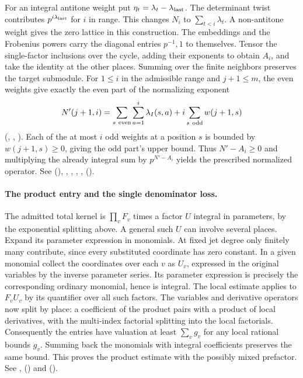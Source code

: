 For an integral antitone weight put $\eta_t=\lambda_t-\lambda_{\rm last}$.
The determinant twist contributes $p^{i\lambda_{\rm last}}$
for $i$ in range. This changes $N_i$ to $\sum_{t<i}\lambda_t$.
A non-antitone weight gives the zero lattice in this construction.
The embeddings and the Frobenius powers carry the diagonal entries
$p^{-1},1$ to themselves. Tensor the single-factor inclusions over
the cycle, adding their exponents to obtain $A_i$, and take the
identity at the other places. Summing over the finite neighbors
preserves the target submodule. For $1\le i$ in the admissible
range and $j+1\le m$, the even weights give exactly the even part
of the normalizing exponent
\[
 N'(j+1,i)=\sum_{s\ {\rm even}}\sum_{a=1}^{i}\lambda_I(s,a)
              +i\sum_{s\ {\rm odd}}w(j+1,s)
\]
(, ,
).
Each of the at most $i$ odd
weights at a position $s$ is bounded by $w(j+1,s)\ge0$, giving
the odd part's upper bound. Thus $N'-A_i\ge0$ and multiplying the
already integral sum by $p^{N'-A_i}$ yields the prescribed normalized
operator. See  (),
, , ,
, 
().

\paragraph{The product entry and the single denominator loss.}
The admitted total kernel is $\prod_v F_v$ times a factor $U$
integral in parameters, by the exponential splitting above. A general
such $U$ can involve several places. Expand its parameter expression
in monomials. At fixed jet degree only finitely many contribute, since
every substituted coordinate has zero constant. In a given monomial
collect the coordinates over each $v$ as $U_v$, expressed in the
original variables by the inverse parameter series. Its parameter
expression is precisely the corresponding ordinary monomial, hence is
integral. The local estimate applies to $F_vU_v$ by its quantifier over
all such factors. The variables and derivative operators now split by
place: a coefficient of the product pairs with a product of local
derivatives, with the multi-index factorial splitting into the local
factorials. Consequently the entries have valuation at least
$\sum_v g_v$ for any local rational bounds $g_v$. Summing back the
monomials with integral coefficients preserves the same bound. This
proves the product estimate with the possibly mixed prefactor.
See , 
() and 
().

